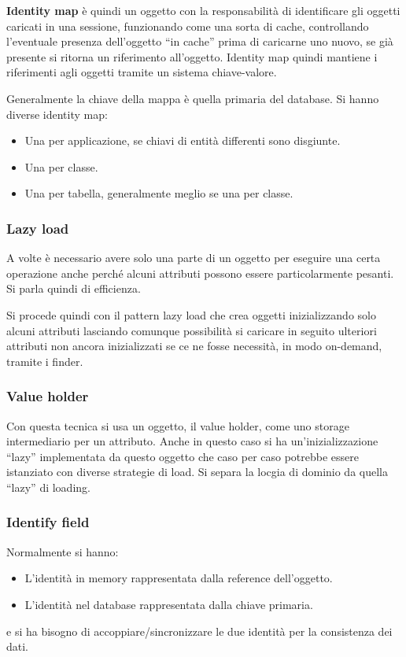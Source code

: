 \textbf{Identity map} è quindi un oggetto con la responsabilità di identificare
gli oggetti caricati in una sessione, funzionando come una sorta di cache,
controllando l'eventuale presenza dell'oggetto “in cache” prima di caricarne uno
nuovo, se già presente si ritorna un riferimento all'oggetto. Identity map quindi
mantiene i riferimenti agli oggetti tramite un sistema chiave-valore.

Generalmente la chiave della mappa è quella primaria del database. Si hanno
diverse identity map:
\begin{itemize}
      \item Una per applicazione, se chiavi di entità differenti sono disgiunte.
      \item Una per classe.
      \item Una per tabella, generalmente meglio se una per classe.
\end{itemize}
\subsubsection{Lazy load}
A volte è necessario avere solo una parte di un oggetto per eseguire una certa
operazione anche perché alcuni attributi possono essere particolarmente pesanti.
Si parla quindi di efficienza.

Si procede quindi con il pattern lazy load che crea oggetti inizializzando solo
alcuni attributi lasciando comunque possibilità si caricare in seguito ulteriori
attributi non ancora inizializzati se ce ne fosse necessità, in modo on-demand,
tramite i finder.
\subsubsection{Value holder}
Con questa tecnica si usa un oggetto, il value holder, come uno storage
intermediario per un attributo. Anche in questo caso si ha un'inizializzazione
“lazy” implementata da questo oggetto che caso per caso potrebbe essere istanziato
con diverse strategie di load. Si separa la locgia di dominio da quella “lazy”
di loading.
\subsubsection{Identify field}
Normalmente si hanno:
\begin{itemize}
      \item L'identità in memory rappresentata dalla reference dell'oggetto.
      \item L'identità nel database rappresentata dalla chiave primaria.
\end{itemize}
e si ha bisogno di accoppiare/sincronizzare le due identità per la consistenza
dei dati.

